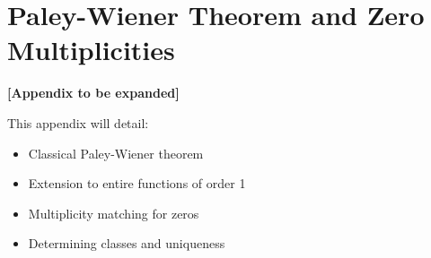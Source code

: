 \section{Paley-Wiener Theorem and Zero Multiplicities}
\label{app:pw_multiplicities}

\textbf{[Appendix to be expanded]}

This appendix will detail:
\begin{itemize}
\item Classical Paley-Wiener theorem
\item Extension to entire functions of order 1
\item Multiplicity matching for zeros
\item Determining classes and uniqueness
\end{itemize}
